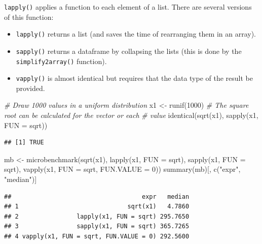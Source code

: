 \documentclass[
  12pt,
  american,
  a4paper,
  extrafontsizes,onecolumn,openright
  ]{memoir}
\newenvironment{Shaded}{\begin{snugshade}}{\end{snugshade}}
\newcommand{\AttributeTok}[1]{\textcolor[rgb]{0.77,0.63,0.00}{#1}}
\newcommand{\CommentTok}[1]{\textcolor[rgb]{0.56,0.35,0.01}{\textit{#1}}}
\newcommand{\DecValTok}[1]{\textcolor[rgb]{0.00,0.00,0.81}{#1}}
\newcommand{\FunctionTok}[1]{\textcolor[rgb]{0.00,0.00,0.00}{#1}}
\newcommand{\NormalTok}[1]{#1}
\newcommand{\OtherTok}[1]{\textcolor[rgb]{0.56,0.35,0.01}{#1}}
\newcommand{\StringTok}[1]{\textcolor[rgb]{0.31,0.60,0.02}{#1}}
\providecommand{\tightlist}{%
  \setlength{\itemsep}{0pt}\setlength{\parskip}{0pt}}
\begin{document}
\texttt{lapply()} applies a function to each element of a list.
There are several versions of this function:

\begin{itemize}
\tightlist
\item
  \texttt{lapply()} returns a list (and saves the time of rearranging them in an array).
\item
  \texttt{sapply()} returns a dataframe by collapsing the lists (this is done by the \texttt{simplify2array()} function).
\item
  \texttt{vapply()} is almost identical but requires that the data type of the result be provided.
\end{itemize}

\scriptsize

\begin{Shaded}
\begin{Highlighting}[]
\CommentTok{\# Draw 1000 values in a uniform distribution}
\NormalTok{x1 }\OtherTok{\textless{}{-}} \FunctionTok{runif}\NormalTok{(}\DecValTok{1000}\NormalTok{)}
\CommentTok{\# The square root can be calculated for the vector or each}
\CommentTok{\# value}
\FunctionTok{identical}\NormalTok{(}\FunctionTok{sqrt}\NormalTok{(x1), }\FunctionTok{sapply}\NormalTok{(x1, }\AttributeTok{FUN =}\NormalTok{ sqrt))}
\end{Highlighting}
\end{Shaded}

\begin{verbatim}
## [1] TRUE
\end{verbatim}

\begin{Shaded}
\begin{Highlighting}[]
\NormalTok{mb }\OtherTok{\textless{}{-}} \FunctionTok{microbenchmark}\NormalTok{(}\FunctionTok{sqrt}\NormalTok{(x1), }\FunctionTok{lapply}\NormalTok{(x1, }\AttributeTok{FUN =}\NormalTok{ sqrt), }\FunctionTok{sapply}\NormalTok{(x1,}
    \AttributeTok{FUN =}\NormalTok{ sqrt), }\FunctionTok{vapply}\NormalTok{(x1, }\AttributeTok{FUN =}\NormalTok{ sqrt, }\AttributeTok{FUN.VALUE =} \DecValTok{0}\NormalTok{))}
\FunctionTok{summary}\NormalTok{(mb)[, }\FunctionTok{c}\NormalTok{(}\StringTok{"expr"}\NormalTok{, }\StringTok{"median"}\NormalTok{)]}
\end{Highlighting}
\end{Shaded}

\begin{verbatim}
##                                    expr   median
## 1                              sqrt(x1)   4.7860
## 2                lapply(x1, FUN = sqrt) 295.7650
## 3                sapply(x1, FUN = sqrt) 365.7265
## 4 vapply(x1, FUN = sqrt, FUN.VALUE = 0) 292.5600
\end{verbatim}
\end{document}
